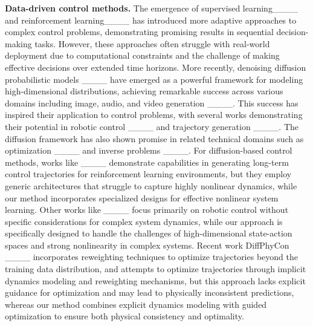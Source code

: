 \textbf{Data-driven control methods.} The emergence of supervised learning____ and reinforcement learning____ has introduced more adaptive approaches to complex control problems, demonstrating promising results in sequential decision-making tasks. However, these approaches often struggle with real-world deployment due to computational constraints and the challenge of making effective decisions over extended time horizons.
More recently, denoising diffusion probabilistic models ____ have emerged as a powerful framework for modeling high-dimensional distributions, achieving remarkable success across various domains including image, audio, and video generation ____. This success has inspired their application to control problems, with several works demonstrating their potential in robotic control ____ and trajectory generation ____. The diffusion framework has also shown promise in related technical domains such as optimization ____ and inverse problems ____. 
For diffusion-based control methods, works like ____ demonstrate capabilities in generating long-term control trajectories for reinforcement learning environments, but they employ generic architectures that struggle to capture highly nonlinear dynamics, while our method incorporates specialized designs for effective nonlinear system learning. Other works like ____ focus primarily on robotic control without specific considerations for complex system dynamics, while our approach is specifically designed to handle the challenges of high-dimensional state-action spaces and strong nonlinearity in complex systems. Recent work DiffPhyCon ____ incorporates reweighting techniques to optimize trajectories beyond the training data distribution, and attempts to optimize trajectories through implicit dynamics modeling and reweighting mechanisms, but this approach lacks explicit guidance for optimization and may lead to physically inconsistent predictions, whereas our method combines explicit dynamics modeling with guided optimization to ensure both physical consistency and optimality. 


